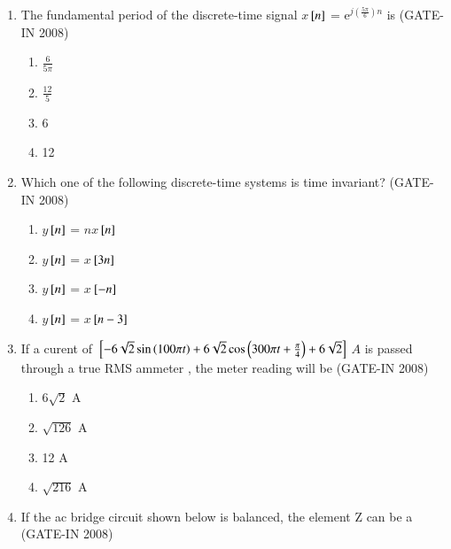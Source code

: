 \documentclass[journal,12pt,onecolumn]{IEEEtran}
\theoremstyle{remark}
\begin{document}
\begin{enumerate}
    \item  The fundamental period of the discrete-time signal
    $x$${}\left[n\right]$ = e$^{j(\frac{5\pi}{6})n}$ is  \hfill{(GATE-IN 2008)}
    \begin{multicols}{4}
    \begin{enumerate} 
        \item $\frac{6}{5\pi}$
        \item $\frac{12}{5}$
        \item 6
        \item 12
    \end{enumerate}
    \end{multicols}
    
    \item  Which one of the following discrete-time systems is time invariant? \hfill{(GATE-IN 2008)}
    \begin{multicols}{4}
    \begin{enumerate} 
        \item $y$${}\left[n\right]$ = $nx$${}\left[n\right]$
        \item $y$${}\left[n\right]$ = $x$${}\left[3n\right]$
        \item $y$${}\left[n\right]$ = $x$${}\left[-n\right]$
        \item $y$${}\left[n\right]$ = $x$${}\left[n-3\right]$
    \end{enumerate}
    \end{multicols}
    
    \item If a curent of ${}\left[-6\sqrt{2}\sin\left(100{\pi}t\right) +6\sqrt{2}\cos\left(300{\pi}t + \frac{\pi}{4}\right) + 6\sqrt{2}\right]$   $A$ is passed through a true RMS ammeter , the meter reading will be \hfill{(GATE-IN 2008)} 
    \begin{multicols}{4}
    \begin{enumerate} 
        \item $6\sqrt{2}$ A
        \item $\sqrt{126}$ A
        \item 12 A
        \item $\sqrt{216}$ A
    \end{enumerate}
    \end{multicols}
    
    \item If the ac bridge circuit shown below  is balanced, the element Z can be a  \hfill{(GATE-IN 2008)}


\end{enumerate}
\end{document}
